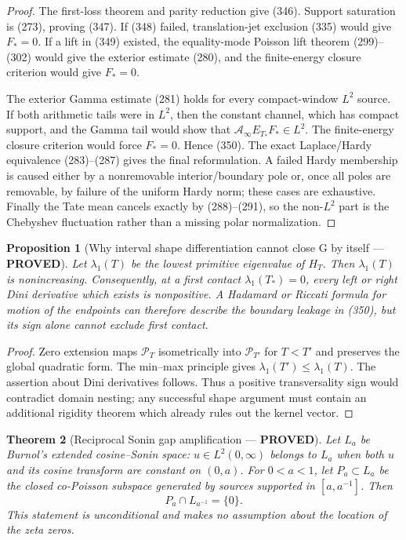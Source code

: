 \documentclass[11pt]{article}
\newtheorem{theorem}{Theorem}
\newtheorem{proposition}[theorem]{Proposition}
\newcommand{\PROVED}{\textcolor{green!45!black}{\textbf{PROVED}}}
\begin{document}
\begin{proof}
The first-loss theorem and parity reduction give (346).  Support saturation
is (273), proving (347).  If (348) failed, translation-jet exclusion (335)
would give $F_*=0$.  If a lift in (349) existed, the equality-mode Poisson
lift theorem (299)--(302) would give the exterior estimate (280), and
the finite-energy closure criterion would give $F_*=0$.

The exterior Gamma estimate (281) holds for every compact-window $L^2$
source.  If both arithmetic tails were in $L^2$, then the constant channel,
which has compact support, and the Gamma tail would show that
$\mathcal A_\infty E_{T_*}F_*\in L^2$.  The finite-energy closure criterion
would force $F_*=0$.  Hence (350).  The exact Laplace/Hardy
equivalence (283)--(287) gives the final reformulation.  A failed Hardy
membership is caused either by a nonremovable interior/boundary pole or, once
all poles are removable, by failure of the uniform Hardy norm; these cases
are exhaustive.  Finally the Tate mean cancels exactly by (288)--(291), so
the non-$L^2$ part is the Chebyshev fluctuation rather than a missing polar
normalization.
\end{proof}

\begin{proposition}[Why interval shape differentiation cannot close G by
itself --- \PROVED]
Let $\lambda_1(T)$ be the lowest primitive eigenvalue of $H_T$.  Then
$\lambda_1(T)$ is nonincreasing.  Consequently, at a first contact
$\lambda_1(T_*)=0$, every left or right Dini derivative which exists is
nonpositive.  A Hadamard or Riccati formula for motion of the endpoints can
therefore describe the boundary leakage in (350), but its sign alone cannot
exclude first contact.
\end{proposition}

\begin{proof}
Zero extension maps $\mathcal P_T$ isometrically into
$\mathcal P_{T'}$ for $T<T'$ and preserves the global quadratic form.
The min--max principle gives $\lambda_1(T')\le\lambda_1(T)$.  The assertion
about Dini derivatives follows.  Thus a positive transversality sign would
contradict domain nesting; any successful shape argument must contain an
additional rigidity theorem which already rules out the kernel vector.
\end{proof}

\begin{theorem}[Reciprocal Sonin gap amplification --- \PROVED]
Let $L_a$ be Burnol's extended cosine--Sonin space: $u\in L^2(0,\infty)$
belongs to $L_a$ when both $u$ and its cosine transform are constant on
$(0,a)$.  For $0<a<1$, let $P_a\subset L_a$ be the closed co-Poisson
subspace generated by sources supported in $[a,a^{-1}]$.  Then
\begin{equation}
 \boxed{P_a\cap L_{a^{-1}}=\{0\}.}                  \tag{351}
\end{equation}
This statement is unconditional and makes no assumption about the location
of the zeta zeros.
\end{theorem}
\end{document}
